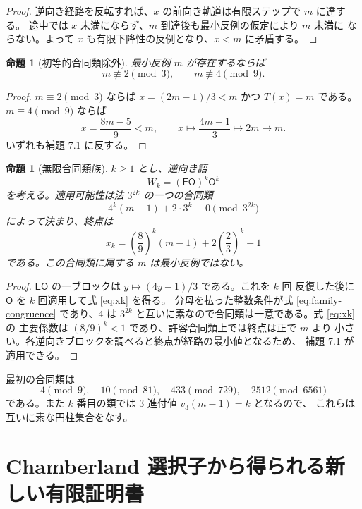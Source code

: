 \documentclass[a4paper,11pt]{ltjsarticle}
\theoremstyle{definition}
\theoremstyle{plain}
\newtheorem{proposition}[definition]{命題}
\newcommand{\Odd}{\mathsf{O}}
\newcommand{\Even}{\mathsf{E}}
\newcommand{\1}{\mathbf{1}}
\begin{document}
\begin{proof}
逆向き経路を反転すれば、$x$ の前向き軌道は有限ステップで $m$ に達する。
途中では $x$ 未満にならず、$m$ 到達後も最小反例の仮定により $m$ 未満に
ならない。よって $x$ も有限下降性の反例となり、$x<m$ に矛盾する。
\end{proof}

\begin{proposition}[初等的合同類除外]
最小反例 $m$ が存在するならば
\[
 m\not\equiv2\pmod3,\qquad m\not\equiv4\pmod9.
\]
\end{proposition}

\begin{proof}
$m\equiv2\pmod3$ ならば $x=(2m-1)/3<m$ かつ $T(x)=m$ である。
$m\equiv4\pmod9$ ならば
\[
 x=\frac{8m-5}{9}<m,\qquad
 x\longmapsto\frac{4m-1}{3}\longmapsto2m\longmapsto m.
\]
いずれも補題 7.1 に反する。
\end{proof}

\begin{proposition}[無限合同類族]
$k\ge1$ とし、逆向き語
\[
 W_k=(\Even\Odd)^k\Odd^k
\]
を考える。適用可能性は法 $3^{2k}$ の一つの合同類
\begin{equation}\label{eq:family-congruence}
 4^k(m-1)+2\cdot3^k\equiv0\pmod{3^{2k}}
\end{equation}
によって決まり、終点は
\begin{equation}\label{eq:xk}
 x_k=\left(\frac89\right)^k(m-1)
 +2\left(\frac23\right)^k-1
\end{equation}
である。この合同類に属する $m$ は最小反例ではない。
\end{proposition}

\begin{proof}
$\Even\Odd$ の一ブロックは $y\mapsto(4y-1)/3$ である。これを $k$ 回
反復した後に $\Odd$ を $k$ 回適用して式 \eqref{eq:xk} を得る。
分母を払った整数条件が式 \eqref{eq:family-congruence} であり、$4$ は
$3^{2k}$ と互いに素なので合同類は一意である。式 \eqref{eq:xk} の
主要係数は $(8/9)^k<1$ であり、許容合同類上では終点は正で $m$ より
小さい。各逆向きブロックを調べると終点が経路の最小値となるため、
補題 7.1 が適用できる。
\end{proof}

最初の合同類は
\[
 4\pmod9,\quad10\pmod{81},\quad433\pmod{729},
 \quad2512\pmod{6561}
\]
である。また $k$ 番目の類では $3$ 進付値 $v_3(m-1)=k$ となるので、
これらは互いに素な円柱集合をなす。

\section{Chamberland 選択子から得られる新しい有限証明書}
\end{document}

